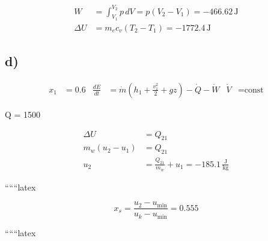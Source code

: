 \begin{align*}
W &= \int_{V_1}^{V_2} p \, dV = p (V_2 - V_1) = -466.62 \, \text{J} \\
\Delta U &= m_e c_v (T_2 - T_1) = -1772.4 \, \text{J}
\end{align*}

\subsection*{d)}
\begin{align*}
x_1 &= 0.6 & \frac{dE}{dt} &= \dot{m} (h_{1} + \frac{v_1^2}{2} + gz) - \dot{Q} - \dot{W} & \dot{V} &= \text{const}
\end{align*}

 Q = 1500 \, 

\begin{align*}
\Delta U &= Q_{21} \\
m_w (u_2 - u_1) &= Q_{21} \\
u_2 &= \frac{Q_{21}}{m_w} + u_1 = -185.1 \, \frac{\text{J}}{\text{kg}}
\end{align*}

``````latex

\[
x_s = \frac{u_2 - u_{\text{min}}}{u_k - u_{\text{min}}} = 0.555
\]

``````latex


